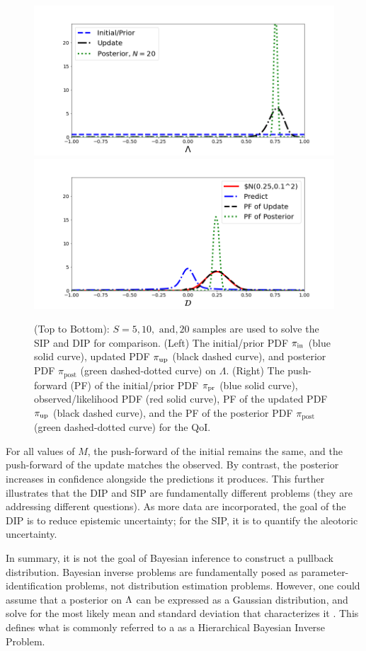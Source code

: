 \begin{ex}
\begin{figure}[htbp]
   \includegraphics[width=0.49\linewidth]{figures/bip-vs-sip-20.png}
   \includegraphics[width=0.49\linewidth]{figures/bip-vs-sip-pf-20.png}
 \caption{(Top to Bottom): $S=5, 10, \text{ and}, 20$ samples are used to solve the SIP and DIP for comparison. (Left) The initial/prior PDF $\operatorname*{\pi_{in}}$ (blue solid curve), updated PDF $\operatorname*{\pi_{up}}$ (black dashed curve), and posterior PDF $\pi_\text{post}$ (green dashed-dotted curve) on $\Lambda$.
 (Right) The push-forward (PF) of the initial/prior PDF $\operatorname*{\pi_{pr}}$ (blue solid curve), observed/likelihood PDF (red solid curve), PF of the updated PDF $\operatorname*{\pi_{up}}$ (black dashed curve), and the PF of the posterior PDF $\pi_\text{post}$ (green dashed-dotted curve) for the QoI.}
 \label{fig:bayes-comparison-convergence}
\end{figure}

For all values of $M$, the push-forward of the initial remains the same, and the push-forward of the update matches the observed.
By contrast, the posterior increases in confidence alongside the predictions it produces.
This further illustrates that the DIP and SIP are fundamentally different problems (they are addressing different questions).
As more data are incorporated, the goal of the DIP is to reduce epistemic uncertainty; for the SIP, it is to quantify the aleotoric uncertainty.

\end{ex}



In summary, it is not the goal of Bayesian inference to construct a pullback distribution.
Bayesian inverse problems are fundamentally posed as parameter-identification problems, not distribution estimation problems.
However, one could assume that a posterior on ${\Lambda}$ can be expressed as a Gaussian distribution, and solve for the most likely mean and standard deviation that characterizes it \citep{Smith, Tarantola_book}.
This defines what is commonly referred to a as a Hierarchical Bayesian Inverse Problem.

